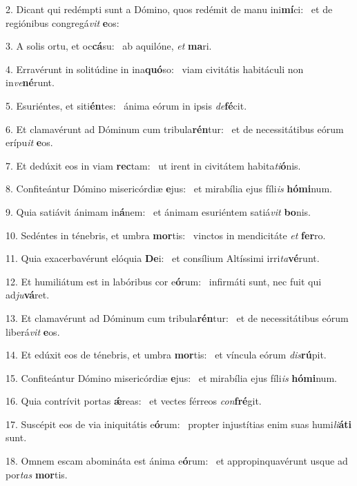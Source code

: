 2. Dicant qui redémpti sunt a Dómino, quos redémit de manu ini\textbf{mí}ci: \ast\  et de regiónibus congregá\textit{vit} \textbf{e}os:\

3. A solis ortu, et oc\textbf{cá}su: \ast\  ab aquilóne, \textit{et} \textbf{ma}ri.\

4. Erravérunt in solitúdine in ina\textbf{quó}so: \ast\  viam civitátis habitáculi non in\textit{ve}\textbf{né}runt.\

5. Esuriéntes, et siti\textbf{én}tes: \ast\  ánima eórum in ipsis \textit{de}\textbf{fé}cit.\

6. Et clamavérunt ad Dóminum cum tribula\textbf{rén}tur: \ast\  et de necessitátibus eórum erípu\textit{it} \textbf{e}os.\

7. Et dedúxit eos in viam \textbf{rec}tam: \ast\  ut irent in civitátem habita\textit{ti}\textbf{ó}nis.\

8. Confiteántur Dómino misericórdiæ \textbf{e}jus: \ast\  et mirabília ejus fíli\textit{is} \textbf{hó}\textbf{mi}num.\

9. Quia satiávit ánimam in\textbf{á}nem: \ast\  et ánimam esuriéntem satiá\textit{vit} \textbf{bo}nis.\

10. Sedéntes in ténebris, et umbra \textbf{mor}tis: \ast\  vinctos in mendicitáte \textit{et} \textbf{fer}ro.\

11. Quia exacerbavérunt elóquia \textbf{De}i: \ast\  et consílium Altíssimi irri\textit{ta}\textbf{vé}runt.\

12. Et humiliátum est in labóribus cor e\textbf{ó}rum: \ast\  infirmáti sunt, nec fuit qui ad\textit{ju}\textbf{vá}ret.\

13. Et clamavérunt ad Dóminum cum tribula\textbf{rén}tur: \ast\  et de necessitátibus eórum liberá\textit{vit} \textbf{e}os.\

14. Et edúxit eos de ténebris, et umbra \textbf{mor}tis: \ast\  et víncula eórum \textit{dis}\textbf{rú}pit.\

15. Confiteántur Dómino misericórdiæ \textbf{e}jus: \ast\  et mirabília ejus fíli\textit{is} \textbf{hó}\textbf{mi}num.\

16. Quia contrívit portas \textbf{ǽ}reas: \ast\  et vectes férreos \textit{con}\textbf{fré}git.\

17. Suscépit eos de via iniquitátis e\textbf{ó}rum: \ast\  propter injustítias enim suas humi\textit{li}\textbf{á}\textbf{ti} sunt.\

18. Omnem escam abomináta est ánima e\textbf{ó}rum: \ast\  et appropinquavérunt usque ad por\textit{tas} \textbf{mor}tis.\

